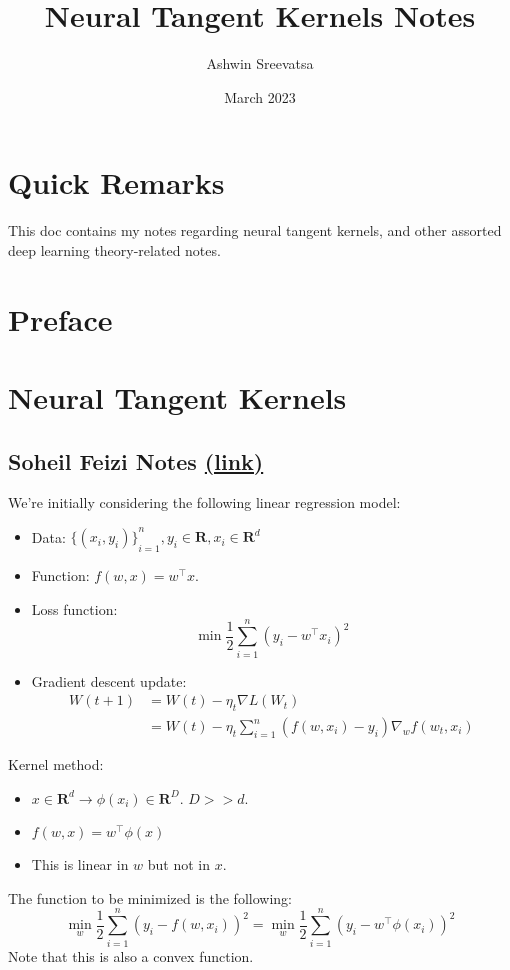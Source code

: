 \documentclass[answers,12pt]{exam}
\title{Neural Tangent Kernels Notes}
\author{Ashwin Sreevatsa}
\date{March 2023}
\begin{document}
\maketitle
\setcounter{section}{-1}

\section*{Quick Remarks}
This doc contains my notes regarding neural tangent kernels, and other assorted deep learning theory-related notes.

\section{Preface}

\section{Neural Tangent Kernels}

\subsection{Soheil Feizi Notes \href{https://www.youtube.com/watch?v=DObobAnELkU}{(link)}}

We're initially considering the following linear regression model: 
\begin{itemize}
    \item Data: ${\{(x_i,y_i)\}}_{i=1}^n, y_i \in \mathbf{R}, x_i \in \mathbf{R}^d$
    \item Function: $f(w,x) = w^{\top} x$. 
    \item Loss function: \[\min \frac{1}{2} \sum_{i=1}^n { (y_i - w^{\top} x_i)}^2\]
    \item Gradient descent update:
    \[ \begin{aligned}
        W(t+1) &= W(t) - \eta_t \nabla L(W_t) \\
        &= W(t) - \eta_t \sum_{i=1}^{n} (f(w,x_i)-y_i) \nabla_w f(w_t, x_i)
        \end{aligned}
    \]
\end{itemize}

Kernel method:

\begin{itemize}
    \item $x \in \mathbf{R}^d \to \phi(x_i) \in \mathbf{R}^D$.
    $D >> d$.
    \item $f(w,x) = w^{\top} \phi(x)$
    \item This is linear in $w$ but not in $x$.
\end{itemize}
The function to be minimized is the following:
\[ 
    \min_w \frac{1}{2} \sum_{i=1}^{n} {(y_i - f(w,x_i))}^2 =
    \min_w \frac{1}{2} \sum_{i=1}^{n} {(y_i - w^{\top}\phi(x_i))}^2
\]
Note that this is also a convex function.
\end{document}
